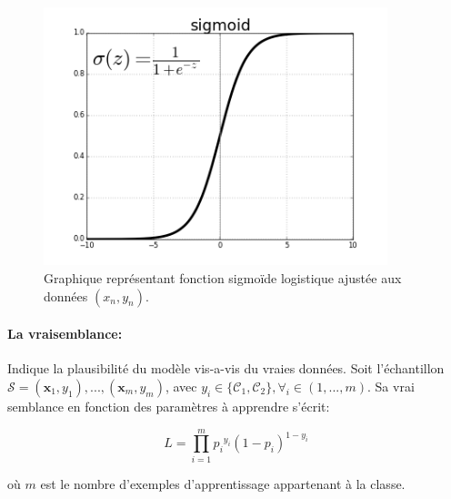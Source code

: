 	
		\begin{figure}[bth]%
			\centering
			\includegraphics[width=10cm]{images/sigmoid_graph.png}
			\caption{Graphique représentant fonction sigmoïde logistique ajustée aux données $(x_n , y_n)$. \cite{ml2008python}
			}
			\label{fig:reg_log_sigmoid}
		\end{figure}
	
	\paragraph*{La vraisemblance:}Indique la plausibilité du  modèle vis-a-vis du vraies données.
	Soit l'échantillon $ \mathcal{S} = {(\mathbf{x}_1, y_1),..., (\mathbf{x}_m, y_m)}$, avec $y_i \in \{\mathcal{C}_1,\mathcal{C}_2\}, \forall_i \in (1,...,m)$. Sa vrai semblance en fonction des paramètres à apprendre s'écrit:
	
	\begin{equation}\label{eq:likelyhood}
		L = \prod_{i=1}^{m} {p_i}^{y_i} (1-p_i)^{1-y_i}
	\end{equation}
	
	où $m$ est le nombre d'exemples d'apprentissage appartenant à la classe.
	
